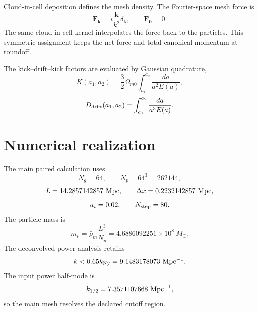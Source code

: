 Cloud-in-cell deposition defines the mesh density.  The Fourier-space mesh force is
\begin{equation}
 \boldsymbol F_{\boldsymbol k}
 =
 i\frac{\boldsymbol k}{k^2}\delta_{\boldsymbol k},
 \qquad \boldsymbol F_{\boldsymbol 0}=0.
 \label{eq:pm-spectral-force}
\end{equation}
The same cloud-in-cell kernel interpolates the force back to the particles.  This symmetric assignment keeps the net force and total canonical momentum at roundoff.

The kick--drift--kick factors are evaluated by Gaussian quadrature,
\begin{equation}
 K(a_1,a_2)
 =
 \frac32\Omega_{m0}
 \int_{a_1}^{a_2}
 \frac{da}{a^2E(a)},
 \label{eq:pm-kick-factor}
\end{equation}
\begin{equation}
 D_{\rm drift}(a_1,a_2)
 =
 \int_{a_1}^{a_2}
 \frac{da}{a^3E(a)}.
 \label{eq:pm-drift-factor}
\end{equation}

\section{Numerical realization}

The main paired calculation uses
\begin{equation}
 N_g=64,
 \qquad
 N_p=64^3=262144,
 \label{eq:pm-main-resolution}
\end{equation}
\begin{equation}
 L=14.2857142857\ {\rm Mpc},
 \qquad
 \Delta x=0.2232142857\ {\rm Mpc},
 \label{eq:pm-box}
\end{equation}
\begin{equation}
 a_i=0.02,
 \qquad
 N_{\rm step}=80.
 \label{eq:pm-time-resolution}
\end{equation}
The particle mass is
\begin{equation}
 m_p
 =
 \bar\rho_m\frac{L^3}{N_p}
 =
 4.6886092251\times10^8\ M_\odot.
 \label{eq:pm-particle-mass}
\end{equation}
The deconvolved power analysis retains
\begin{equation}
 k<0.65k_{\rm Ny}
 =9.1483178073\ {\rm Mpc}^{-1}.
 \label{eq:pm-usable-k}
\end{equation}
The input power half-mode is
\begin{equation}
 k_{1/2}=7.3571107668\ {\rm Mpc}^{-1},
 \label{eq:pm-input-half-mode}
\end{equation}
so the main mesh resolves the declared cutoff region.

